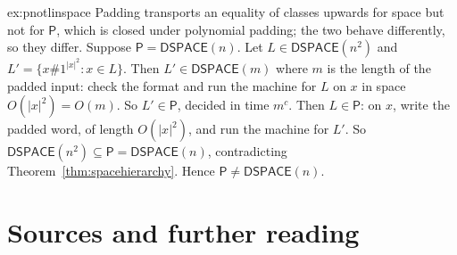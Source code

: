 \begin{solution}{ex:pnotlinspace}
\idea Padding transports an equality of classes upwards for space but not for $\mathsf P$, which is closed under polynomial padding; the two behave differently, so they differ.
\writeup Suppose $\mathsf P=\mathsf{DSPACE}(n)$. Let $L\in\mathsf{DSPACE}(n^2)$ and $L'=\{x\#1^{|x|^2}:x\in L\}$. Then $L'\in\mathsf{DSPACE}(m)$ where $m$ is the length of the padded input: check the format and run the machine for $L$ on $x$ in space $O(|x|^2)=O(m)$. So $L'\in\mathsf P$, decided in time $m^c$. Then $L\in\mathsf P$: on $x$, write the padded word, of length $O(|x|^2)$, and run the machine for $L'$. So $\mathsf{DSPACE}(n^2)\subseteq\mathsf P=\mathsf{DSPACE}(n)$, contradicting Theorem~\ref{thm:spacehierarchy}. Hence $\mathsf P\ne\mathsf{DSPACE}(n)$.
\end{solution}

\section*{Sources and further reading}

